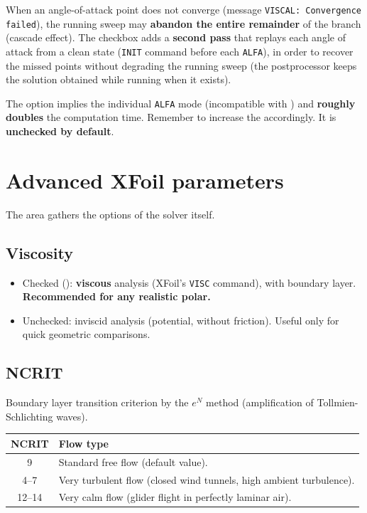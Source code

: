 When an angle-of-attack point does not converge (message
\texttt{VISCAL: Convergence failed}), the running sweep may
\textbf{abandon the entire remainder} of the branch (cascade effect).
The  checkbox adds a \textbf{second pass}
that replays each angle of attack from a clean state (\texttt{INIT}
command before each \texttt{ALFA}), in order to recover the missed
points without degrading the running sweep (the
postprocessor keeps the solution obtained while running when it
exists).

\begin{attention}
The  option implies the individual \texttt{ALFA}
mode (incompatible with ) and \textbf{roughly doubles}
the computation time. Remember to increase the 
accordingly. It is \textbf{unchecked by default}.
\end{attention}

\section{Advanced XFoil parameters}

The  area gathers the options of the solver
itself.

\subsection{Viscosity}

\begin{itemize}
    \item Checked (): \textbf{viscous} analysis
        (XFoil's \texttt{VISC} command), with boundary layer.
        \textbf{Recommended for any realistic polar.}
    \item Unchecked: inviscid analysis (potential, without
        friction). Useful only for quick geometric
        comparisons.
\end{itemize}

\subsection{NCRIT}

Boundary layer transition criterion by the $e^N$ method
(amplification of Tollmien-Schlichting waves).

\begin{tabularx}{\linewidth}{c X}
    \toprule
    \textbf{NCRIT} & \textbf{Flow type} \\
    \midrule
    9       & Standard free flow (default value). \\
    4--7    & Very turbulent flow (closed wind tunnels,
              high ambient turbulence). \\
    12--14  & Very calm flow (glider flight in
              perfectly laminar air). \\
    \bottomrule
\end{tabularx}

